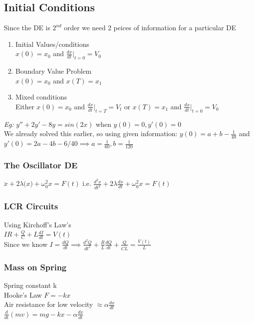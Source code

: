 \documentclass[11pt]{article}
\theoremstyle{definition}
\begin{document}
\subsection{Initial Conditions}
Since the DE is $2^{nd}$ order we need 2 peices of information for a particular DE
\begin{enumerate}
    \item Initial Values/conditions\\
    $x(0) = x_0$ and $\frac{dx}{dt}|_{t = 0} = V_0$
    \item Boundary Value Problem\\
    $x(0) = x_0$ and $x(T) = x_1$
    \item Mixed conditions\\
    Either $x(0) = x_0$ and $\frac{dx}{dt}|_{t = T} = V_t$ or $x(T) = x_1$ and $\frac{dx}{dt}|_{t = 0} = V_0$
\end{enumerate}
\textit{Eg:} $y'' +2y' -8y = sin(2x)$ when $y(0) = 0 , y'(0) = 0$\\
We already solved this earlier, so using given information:
$y(0) = a + b - \frac{1}{40}$ and $y'(0) = 2a - 4b -6/40 \implies a = \frac{1}{60}, b = \frac{1}{120}$
\subsubsection{The Oscillator DE}
$\ddot{x} + 2\lambda\dot(x) + \omega_0^2x = F(t)$ i.e. $\frac{d^2x}{dt^2} + 2\lambda \frac{dx}{dt} + \omega_0^2x = F(t)$
\subsubsection{LCR Circuits}
Using Kirchoff's Law's\\
$IR + \frac{Q}{C} + L\frac{dI}{dt} = V(t)$\\
Since we know $I = \frac{dQ}{dt} \implies \frac{d^2Q}{dt^2} + \frac{R}{L}\frac{dQ}{dt} + \frac{Q}{C\dot L} = \frac{V(t)}{L}$
\subsubsection{Mass on Spring}
Spring constant k \\ Hooke's Law $F = -kx$\\ Air resistance for low velocity $\approx \alpha \frac{dx}{dt}$\\
$\frac{d}{dt}(mv) = mg -kx -\alpha \frac{dx}{dt}$
\newpage
\end{document}

